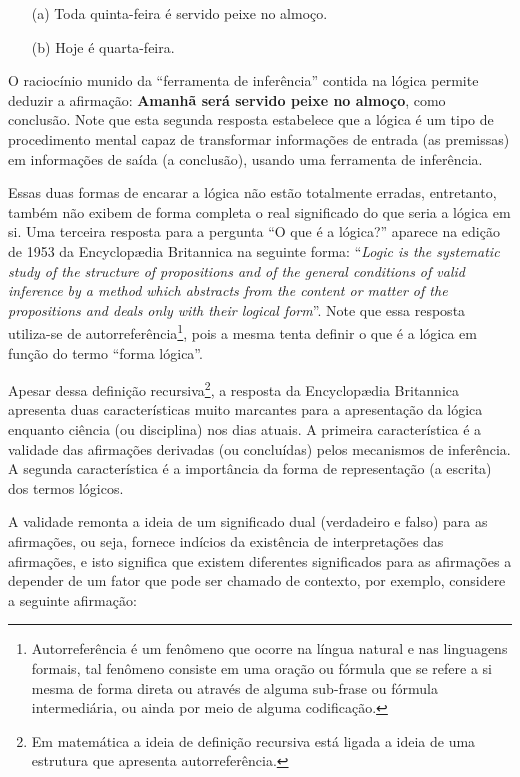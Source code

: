 \begin{itemize}
	\item[(a)] Toda quinta-feira é servido peixe no almoço.
	\item[(b)] Hoje é quarta-feira.
\end{itemize}

O raciocínio munido da ``ferramenta de inferência'' contida na lógica permite deduzir a afirmação: \textbf{Amanhã será servido peixe no almoço}, como conclusão. Note que esta segunda resposta estabelece que a lógica é um tipo de procedimento mental capaz de transformar informações de entrada (as premissas) em informações de saída (a conclusão), usando uma ferramenta de inferência.

Essas duas formas de encarar a lógica não estão totalmente erradas, entretanto, também não exibem de forma completa o real significado do que seria a lógica em si. Uma terceira resposta para a pergunta ``O que é a lógica?'' aparece na edição de 1953 da Encyclopædia Britannica na seguinte forma: ``\textit{Logic is the systematic study of the structure of propositions and of the general conditions of valid inference by a method which abstracts from the content or matter of the propositions and deals only with their logical form}''. Note que essa resposta utiliza-se de autorreferência\footnote{Autorreferência é um fenômeno que ocorre na língua natural e nas linguagens formais, tal fenômeno consiste em uma oração ou fórmula que se refere a si mesma de forma direta ou através de alguma sub-frase ou fórmula intermediária, ou ainda por meio de alguma codificação.}, pois a mesma tenta definir o que é a lógica em função do termo ``forma lógica''.

Apesar dessa definição recursiva\footnote{Em matemática a ideia de definição recursiva está ligada a ideia de uma estrutura que apresenta autorreferência.}, a resposta da Encyclopædia Britannica apresenta duas características muito marcantes para a apresentação da lógica enquanto ciência (ou disciplina) nos dias atuais. A primeira característica é a validade das afirmações derivadas (ou concluídas) pelos mecanismos de inferência. A segunda característica é a importância da forma de representação (a escrita) dos termos lógicos.

A validade remonta a ideia de um significado dual (verdadeiro e falso) para as afirmações, ou seja, fornece indícios da existência de interpretações das afirmações, e isto significa que existem diferentes significados para as afirmações a depender de um fator que pode ser chamado de contexto, por exemplo, considere a seguinte afirmação:

